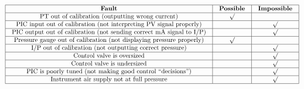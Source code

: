 
$$\vbox{\offinterlineskip
\halign{\strut
\vrule \quad\hfil # \ \hfil & 
\vrule \quad\hfil # \ \hfil & 
\vrule \quad\hfil # \ \hfil \vrule \cr
\noalign{\hrule}
%
{\bf Fault} & {\bf Possible} & {\bf Impossible} \cr
%
\noalign{\hrule}
%
PT out of calibration (outputting wrong current) & $\surd$ &  \cr
%
\noalign{\hrule}
%
PIC input out of calibration (not interpreting PV signal properly) &  & $\surd$ \cr
%
\noalign{\hrule}
%
PIC output out of calibration (not sending correct mA signal to I/P) &  & $\surd$ \cr
%
\noalign{\hrule}
%
Pressure gauge out of calibration (not displaying pressure properly) & $\surd$ &  \cr
%
\noalign{\hrule}
%
I/P out of calibration (not outputting correct pressure) &  & $\surd$ \cr
%
\noalign{\hrule}
%
Control valve is oversized &  & $\surd$ \cr
%
\noalign{\hrule}
%
Control valve is undersized &  & $\surd$ \cr
%
\noalign{\hrule}
%
PIC is poorly tuned (not making good control ``decisions'') &  & $\surd$ \cr
%
\noalign{\hrule}
%
Instrument air supply not at full pressure &  & $\surd$ \cr
%
\noalign{\hrule}
} %
}$$ %




